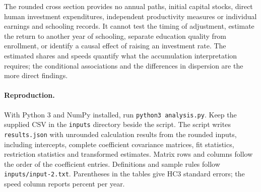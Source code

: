 \documentclass[11pt]{article}
\begin{document}
The rounded cross section provides no annual paths, initial capital stocks, direct human investment expenditures, independent productivity measures or individual earnings and schooling records. It cannot test the timing of adjustment, estimate the return to another year of schooling, separate education quality from enrollment, or identify a causal effect of raising an investment rate. The estimated shares and speeds quantify what the accumulation interpretation requires; the conditional associations and the differences in dispersion are the more direct findings.

\paragraph{Reproduction.}
\raggedright With Python 3 and NumPy installed, run \texttt{python3 analysis.py}. Keep the supplied CSV in the \texttt{inputs} directory beside the script. The script writes \texttt{results.json} with unrounded calculation results from the rounded inputs, including intercepts, complete coefficient covariance matrices, fit statistics, restriction statistics and transformed estimates. Matrix rows and columns follow the order of the coefficient entries. Definitions and sample rules follow \texttt{inputs/input-2.txt}. Parentheses in the tables give HC3 standard errors; the speed column reports percent per year.
\end{document}
